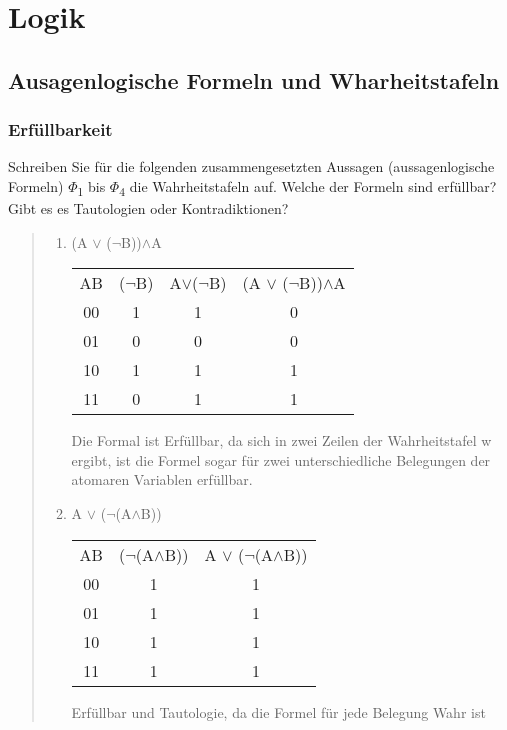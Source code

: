 \chapter{Logik}
\section{Ausagenlogische Formeln und Wharheitstafeln}
\subsection{Erfüllbarkeit}
Schreiben Sie für die folgenden zusammengesetzten Aussagen
(aussagenlogische Formeln) $\Phi$\textsubscript{1} bis $\Phi$\textsubscript{4}
die Wahrheitstafeln auf. Welche der Formeln sind erfüllbar? Gibt es es Tautologien
oder Kontradiktionen?
\begin{quote}
    \begin{enumerate}[label = {$\Phi$\textsubscript{\arabic*} =}]
        \item (A $\vee$ ($\neg$B))$\wedge$A\\
            {\tiny
            \begin{tabular}{cccc}
                AB & ($\neg$B) & A$\vee$($\neg$B) & (A $\vee$ ($\neg$B))$\wedge$A\\
                00 & 1 & 1 & 0 \\
                01 & 0 & 0 & 0 \\
                10 & 1 & 1 & 1 \\
                11 & 0 & 1 & 1 \\
            \end{tabular}
            Die Formal ist Erfüllbar, da sich in zwei Zeilen der Wahrheitstafel
            w ergibt, ist die Formel sogar für zwei unterschiedliche Belegungen
            der atomaren Variablen erfüllbar.}
        \item A $\vee$ ($\neg$(A$\wedge$B))\\
            {\tiny
            \begin{tabular}{ccc}
                AB & ($\neg$(A$\wedge$B)) & A $\vee$ ($\neg$(A$\wedge$B))\\
                00 & 1 & 1\\
                01 & 1 & 1\\
                10 & 1 & 1\\
                11 & 1 & 1\\
            \end{tabular}
            Erfüllbar und Tautologie, da die Formel für jede Belegung Wahr ist}

\end{enumerate}
\end{quote}
